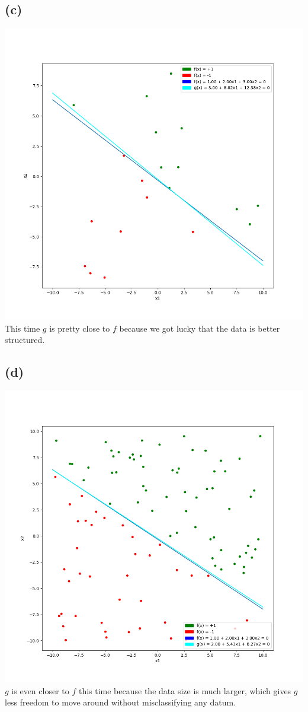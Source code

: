 \documentclass{article}
\begin{document}
	\subsection*{(c)}
		\includegraphics[scale=0.7]{p1.4c.png}\\
		This time $g$ is pretty close to $f$ because we got lucky that the data is better structured.
	\subsection*{(d)}
		\includegraphics[scale=0.7]{p1.4d.png}\\
		$g$ is even closer to $f$ this time because the data size is much larger, which gives $g$ less freedom to move around without misclassifying any datum.
\end{document}

